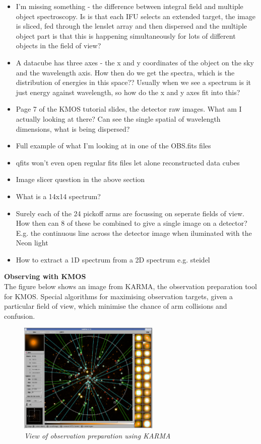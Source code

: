 \documentclass{literature}
\begin{document}
\begin{itemize}
\item I'm missing something - the difference between integral field and multiple object spectroscopy. Is is that each IFU selects an extended target, the image is sliced, fed through the lenslet array and then dispersed and the multiple object part is that this is happening simultaneously for lots of different objects in the field of view? 
\item A datacube has three axes - the x and y coordinates of the object on the sky and the wavelength axis. How then do we get the spectra, which is the distribution of energies in this space?? Usually when we see a spectrum is it just energy against wavelength, so how do the x and y axes fit into this? 
\item Page 7 of the KMOS tutorial slides, the detector raw images. What am I actually looking at there? Can see the single spatial of wavelength dimensions, what is being dispersed? 
\item Full example of what I'm looking at in one of the OBS.fits files
\item qfits won't even open regular fits files let alone reconstructed data cubes
\item Image slicer question in the above section
\item What is a 14x14 spectrum? 
\item Surely each of the 24 pickoff arms are focussing on seperate fields of view. How then can 8 of these be combined to give a single image on a detector? E.g. the continuous line across the detector image when iluminated with the Neon light 
\item How to extract a 1D spectrum from a 2D spectrum e.g. steidel
\end{itemize} 

\textbf{Observing with KMOS} \\

The figure below shows an image from KARMA, the observation preparation tool for KMOS. Special algorithms for maximising observation targets, given a particular field of view, which minimise the chance of arm collisions and confusion.

\begin{figure}[!htp]
\centering
\includegraphics[width=0.6\textwidth]{kmos_karma.png}
\caption{\footnotesize{\emph{View of observation preparation using KARMA}}}
\label{fig:kmos_karma}
\end{figure} 
\end{document}
